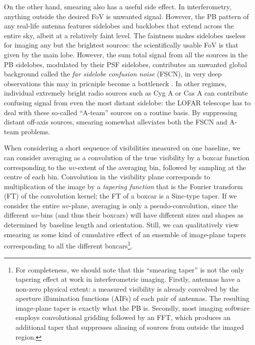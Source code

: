 \documentclass[useAMS,usenatbib]{mn2e}
\begin{document}
On the other hand, smearing also has a useful side effect. In interferometry, anything outside the desired FoV is unwanted 
signal. However, the PB pattern of any real-life antenna features sidelobes and backlobes 
that extend across the entire sky, albeit at a relatively faint level. The faintness makes sidelobes useless for imaging any 
but the brightest sources: the scientifically usable FoV is that given by the main lobe. However, the 
sum total signal from all the sources in the PB sidelobes, modulated by their PSF sidelobes, contributes an unwanted global 
background called the \emph{far sidelobe confusion noise} (FSCN), in very deep observations this may in pricniple become a
bottleneck \citep{icea-fscn}. In other regimes, individual extremely bright radio sources such as Cyg A or 
Cas A can contribute confusing signal from even the most distant  sidelobe: the LOFAR telescope \citep{LOFAR} has to deal 
with these so-called ``A-team'' sources 
on a routine basis. By suppressing distant off-axis sources, smearing somewhat alleviates both the FSCN and A-team problems.

When considering a short sequence of visibilities measured on one baseline, we can consider averaging as a convolution of the 
true visibility by a boxcar function corresponding to the $uv$-extent of the averaging bin, followed by sampling at the 
centre of each bin. Convolution in the visibility plane corresponds to multiplication of the image by a \emph{tapering function} 
that is the Fourier transform (FT) of the convolution kernel; the FT of a boxcar is a Sinc-type taper. If
we consider the entire $uv$-plane, averaging is only a pseudo-convolution, since the different $uv$-bins (and thus
their boxcars) will have different sizes and shapes as determined by baseline length and orientation. Still, we can 
qualitatively view smearing  as some kind of cumulative effect of an ensemble of image-plane tapers corresponding to all the 
different boxcars\footnote{For completeness, we should note that  this ``smearing taper'' is not the only tapering effect 
at work in interferometric imaging. Firstly, antennas have a non-zero 
physical extent: a measured visibility is already convolved by the aperture illumination functions (AIFs) of each pair of 
antennas. The resulting image-plane taper is exactly what the PB is. Secondly, most imaging software employs 
convolutional gridding followed by an FFT, which produces an additional taper that suppresses aliasing of sources from 
outside the imaged region.}. 
\end{document}
